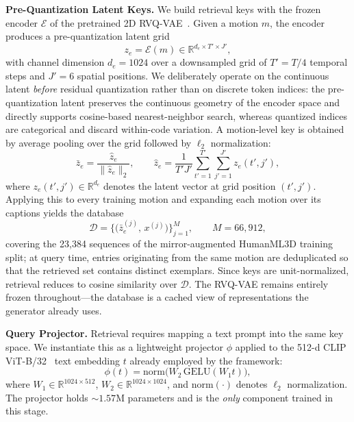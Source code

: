 \documentclass[10pt,journal,compsoc]{IEEEtran}
\newcommand{\myparagraph}[1]{\textbf{#1}\hspace{1.8ex}}
\begin{document}
\noindent \myparagraph{Pre-Quantization Latent Keys.}
We build retrieval keys with the frozen encoder $\mathcal{E}$ of the pretrained 2D RVQ-VAE~\cite{mogents}. Given a motion $m$, the encoder produces a pre-quantization latent grid
\begin{equation}
z_e = \mathcal{E}(m) \in \mathbb{R}^{d_e \times T' \times J'},
\end{equation}
with channel dimension $d_e = 1024$ over a downsampled grid of $T' = T/4$ temporal steps and $J' = 6$ spatial positions. We deliberately operate on the continuous latent \emph{before} residual quantization rather than on discrete token indices: the pre-quantization latent preserves the continuous geometry of the encoder space and directly supports cosine-based nearest-neighbor search, whereas quantized indices are categorical and discard within-code variation. A motion-level key is obtained by average pooling over the grid followed by $\ell_2$ normalization:
\begin{equation}
\bar{z}_e
=
\frac{\hat{z}_e}{\|\hat{z}_e\|_2},
\qquad
\hat{z}_e
=
\frac{1}{T' J'}
\sum_{t'=1}^{T'}
\sum_{j'=1}^{J'}
z_e(t', j'),
\end{equation}
where $z_e(t', j') \in \mathbb{R}^{d_e}$ denotes the latent vector at grid position $(t', j')$. Applying this to every training motion and expanding each motion over its captions yields the database
\begin{equation}
\mathcal{D}
=
\big\{ \big( \bar{z}_e^{(j)},\, x^{(j)} \big) \big\}_{j=1}^{M},
\qquad
M = 66{,}912,
\end{equation}
covering the 23{,}384 sequences of the mirror-augmented HumanML3D training split; at query time, entries originating from the same motion are deduplicated so that the retrieved set contains distinct exemplars. Since keys are unit-normalized, retrieval reduces to cosine similarity over $\mathcal{D}$. The RVQ-VAE remains entirely frozen throughout---the database is a cached view of representations the generator already uses.

\noindent \myparagraph{Query Projector.}
Retrieval requires mapping a text prompt into the same key space. We instantiate this as a lightweight projector $\phi$ applied to the 512-d CLIP ViT-B/32~\cite{clip} text embedding $t$ already employed by the framework:
\begin{equation}
\phi(t)
=
\mathrm{norm}\big( W_2\, \mathrm{GELU}( W_1 t ) \big),
\end{equation}
where $W_1 \in \mathbb{R}^{1024 \times 512}$, $W_2 \in \mathbb{R}^{1024 \times 1024}$, and $\mathrm{norm}(\cdot)$ denotes $\ell_2$ normalization. The projector holds ${\sim}1.57$M parameters and is the \emph{only} component trained in this stage.
\end{document}
